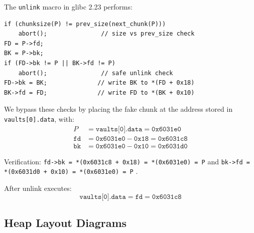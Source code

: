 \documentclass[12pt,a4paper]{article}
\begin{document}
The \texttt{unlink} macro in glibc 2.23 performs:
\begin{lstlisting}[style=asm, caption={Simplified unlink check}]
if (chunksize(P) != prev_size(next_chunk(P)))
    abort();               // size vs prev_size check
FD = P->fd;
BK = P->bk;
if (FD->bk != P || BK->fd != P)
    abort();               // safe unlink check
FD->bk = BK;              // write BK to *(FD + 0x18)
BK->fd = FD;              // write FD to *(BK + 0x10)
\end{lstlisting}

We bypass these checks by placing the fake chunk at the address stored in
\texttt{vaults[0].data}, with:
\begin{align*}
P &= \texttt{vaults[0].data} = \texttt{0x6031e0} \\
\texttt{fd} &= \texttt{0x6031e0} - \texttt{0x18} = \texttt{0x6031c8} \\
\texttt{bk} &= \texttt{0x6031e0} - \texttt{0x10} = \texttt{0x6031d0}
\end{align*}

Verification: \texttt{fd->bk = *(0x6031c8 + 0x18) = *(0x6031e0) = P} \checkmark{}
and \texttt{bk->fd = *(0x6031d0 + 0x10) = *(0x6031e0) = P} \checkmark{}.

After unlink executes:
\[
  \texttt{vaults[0].data} = \texttt{fd} = \texttt{0x6031c8}
\]

\subsection{Heap Layout Diagrams}
\end{document}

